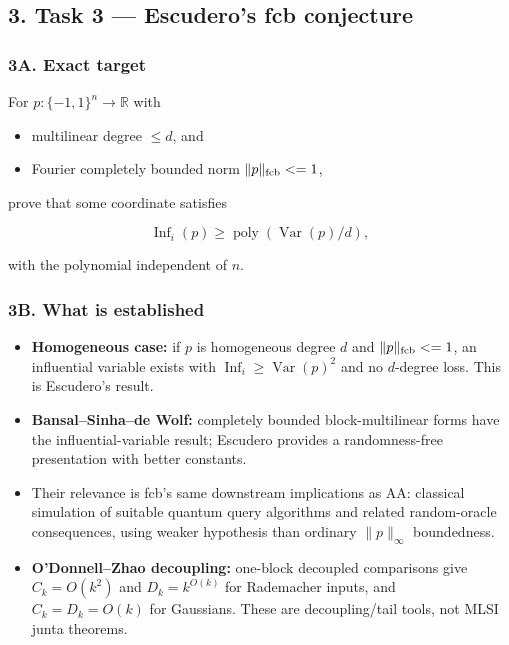 \subsection{3. Task 3 --- Escudero's fcb conjecture}\label{task-3-escuderos-fcb-conjecture}

\subsubsection{3A. Exact target}\label{a.-exact-target}

For \(p:\{-1,1\}^n\to\mathbb R\) with

\begin{itemize}
\tightlist
\item
  multilinear degree \(\le d\), and
\item
  Fourier completely bounded norm \(\|p\|_{\rm fcb}\le1\),
\end{itemize}

prove that some coordinate satisfies

\[\operatorname{Inf}_i(p)\ge\operatorname{poly}(\operatorname{Var}(p)/d),\]

with the polynomial independent of \(n\).

\subsubsection{3B. What is established}\label{b.-what-is-established}

\begin{itemize}
\tightlist
\item
  \textbf{Homogeneous case:} if \(p\) is homogeneous degree \(d\) and \(\|p\|_{\rm fcb}\le1\), an influential variable exists with \(\operatorname{Inf}_i\ge\operatorname{Var}(p)^2\) and no \(d\)-degree loss. This is Escudero's result.
\item
  \textbf{Bansal--Sinha--de Wolf:} completely bounded block-multilinear forms have the influential-variable result; Escudero provides a randomness-free presentation with better constants.
\item
  Their relevance is fcb's same downstream implications as AA: classical simulation of suitable quantum query algorithms and related random-oracle consequences, using weaker hypothesis than ordinary \(\|p\|_\infty\) boundedness.
\item
  \textbf{O'Donnell--Zhao decoupling:} one-block decoupled comparisons give \(C_k=O(k^2)\) and \(D_k=k^{O(k)}\) for Rademacher inputs, and \(C_k=D_k=O(k)\) for Gaussians. These are decoupling/tail tools, not MLSI junta theorems.
\end{itemize}

